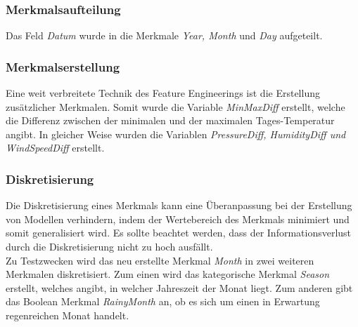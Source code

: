 \subsubsection{Merkmalsaufteilung}
Das Feld \emph{Datum} wurde in die Merkmale \emph{Year, Month} und \emph{Day} aufgeteilt.

\subsubsection{Merkmalserstellung}
Eine weit verbreitete Technik des Feature Engineerings ist die Erstellung zusätzlicher Merkmalen. Somit wurde die Variable \emph{MinMaxDiff} erstellt, welche die Differenz zwischen der minimalen und der maximalen Tages-Temperatur angibt. In gleicher Weise wurden die Variablen \emph{PressureDiff, HumidityDiff und WindSpeedDiff} erstellt.

\subsubsection{Diskretisierung}
Die Diskretisierung eines Merkmals kann eine Überanpassung bei der Erstellung von Modellen verhindern, indem der Wertebereich des Merkmals minimiert und somit generalisiert wird. Es sollte beachtet werden, dass der Informationsverlust durch die Diskretisierung nicht zu hoch ausfällt.\\
\noindent \hspace*{7mm}
Zu Testzwecken wird das neu erstellte Merkmal \emph{Month} in zwei weiteren Merkmalen diskretisiert. Zum einen wird das kategorische Merkmal \emph{Season} erstellt, welches angibt,  in welcher Jahreszeit der Monat liegt. Zum anderen gibt das Boolean Merkmal \emph{RainyMonth} an, ob es sich um einen in Erwartung regenreichen Monat handelt.

